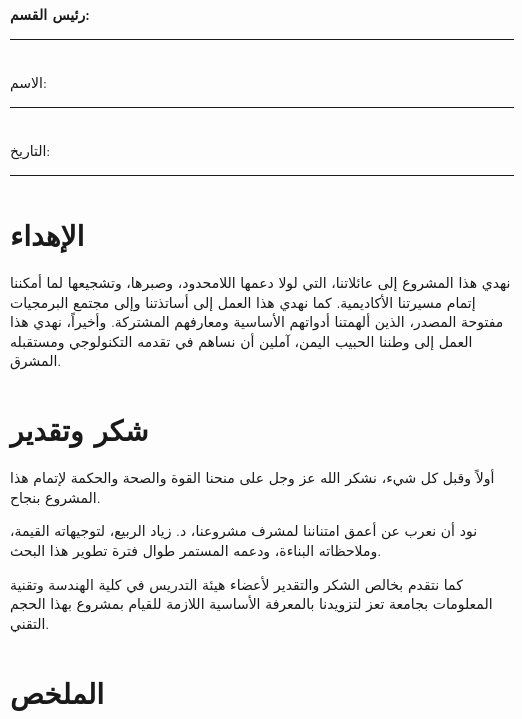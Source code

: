 \documentclass[12pt,a4paper]{report}
\begin{document}
\begin{Arabic}
\vspace{0.75cm}

\noindent\textbf{رئيس القسم:}\\
\noindent\rule{8cm}{0.4pt}\\
الاسم: \rule{5cm}{0.4pt}\\
التاريخ: \rule{4cm}{0.4pt}

\chapter*{الإهداء}

نهدي هذا المشروع إلى عائلاتنا، التي لولا دعمها اللامحدود، وصبرها، وتشجيعها لما أمكننا إتمام مسيرتنا الأكاديمية. كما نهدي هذا العمل إلى أساتذتنا وإلى مجتمع البرمجيات مفتوحة المصدر، الذين ألهمتنا أدواتهم الأساسية ومعارفهم المشتركة. وأخيراً، نهدي هذا العمل إلى وطننا الحبيب اليمن، آملين أن نساهم في تقدمه التكنولوجي ومستقبله المشرق.

\chapter*{شكر وتقدير}

أولاً وقبل كل شيء، نشكر الله عز وجل على منحنا القوة والصحة والحكمة لإتمام هذا المشروع بنجاح.

نود أن نعرب عن أعمق امتناننا لمشرف مشروعنا، د. زياد الربيع، لتوجيهاته القيمة، وملاحظاته البناءة، ودعمه المستمر طوال فترة تطوير هذا البحث.

كما نتقدم بخالص الشكر والتقدير لأعضاء هيئة التدريس في كلية الهندسة وتقنية المعلومات بجامعة تعز لتزويدنا بالمعرفة الأساسية اللازمة للقيام بمشروع بهذا الحجم التقني.
\end{Arabic}


\chapter*{\textarabic{الملخص}}
\end{document}
